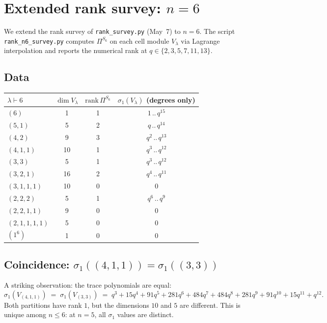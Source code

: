 \documentclass[11pt]{article}
\theoremstyle{definition}
\begin{document}
\section{Extended rank survey: $n = 6$}\label{sec:n6}

We extend the rank survey of \texttt{rank\_survey.py} (May~7) to $n = 6$.
The script \texttt{rank\_n6\_survey.py} computes
$\Pi^{S_6}$ on each cell module $V_\lambda$ via Lagrange interpolation
and reports the numerical rank at $q \in \{2,3,5,7,11,13\}$.

\subsection{Data}

\begin{center}
\begin{tabular}{l c c c}
\toprule
$\lambda \vdash 6$ & $\dim V_\lambda$ & $\mathrm{rank}\,\Pi^{S_6}$ & $\sigma_1(V_\lambda)$ (degrees only) \\
\midrule
$(6)$         &  1 & 1 & $1$\,..\,$q^{15}$ \\
$(5, 1)$      &  5 & 2 & $q$\,..\,$q^{14}$ \\
$(4, 2)$      &  9 & 3 & $q^2$\,..\,$q^{13}$ \\
$(4, 1, 1)$   & 10 & 1 & $q^3$\,..\,$q^{12}$ \\
$(3, 3)$      &  5 & 1 & $q^3$\,..\,$q^{12}$ \\
$(3, 2, 1)$   & 16 & 2 & $q^4$\,..\,$q^{11}$ \\
$(3, 1, 1, 1)$& 10 & 0 & $0$ \\
$(2, 2, 2)$   &  5 & 1 & $q^6$\,..\,$q^9$ \\
$(2, 2, 1, 1)$&  9 & 0 & $0$ \\
$(2, 1, 1, 1, 1)$ & 5 & 0 & $0$ \\
$(1^6)$       &  1 & 0 & $0$ \\
\bottomrule
\end{tabular}
\end{center}

\subsection{Coincidence: $\sigma_1((4,1,1)) = \sigma_1((3,3))$}

A striking observation: the trace polynomials are equal:
\[
\sigma_1(V_{(4,1,1)}) \;=\; \sigma_1(V_{(3,3)}) \;=\;
q^3 + 15 q^4 + 91 q^5 + 281 q^6 + 484 q^7 + 484 q^8 + 281 q^9 + 91 q^{10} + 15 q^{11} + q^{12}.
\]
Both partitions have rank $1$, but the dimensions $10$ and $5$ are different.
This is unique among $n \leq 6$: at $n=5$, all $\sigma_1$ values are
distinct.
\end{document}
